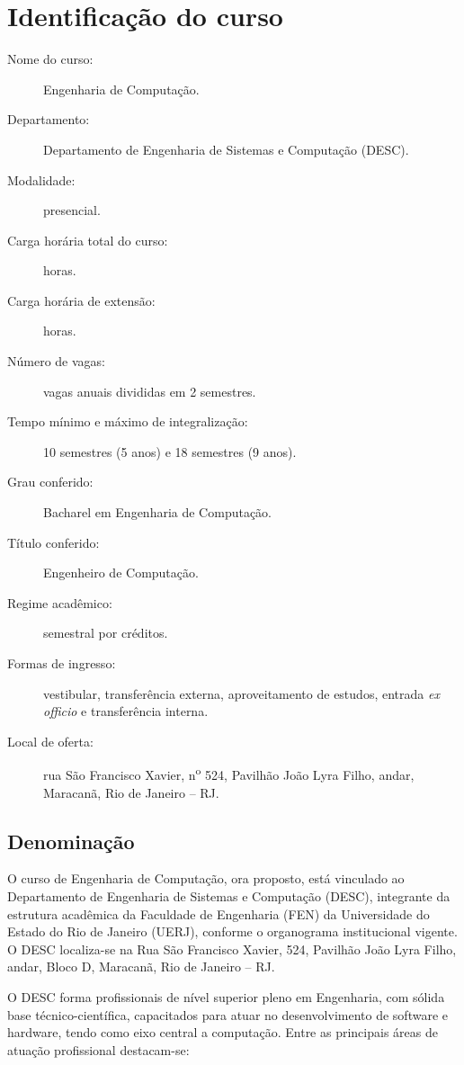 \chapter{Identificação do curso}
\thispagestyle{plain}

\begin{description}
    \item [Nome do curso:] Engenharia de Computação.
    \item [Departamento:] Departamento de Engenharia de Sistemas e Computação (DESC).
    \item [Modalidade:] presencial.
    \item [Carga horária total do curso:] \tHorasCurso horas.
    \item [Carga horária de extensão:] \hExtensao horas.
    \item [Número de vagas:] \vagas vagas anuais divididas em 2 semestres.
    \item [Tempo mínimo e máximo de integralização:] 10 semestres (5 anos) e 18 semestres (9 anos).
    \item [Grau conferido:] Bacharel em Engenharia de Computação.
    \item [Título conferido:] Engenheiro de Computação.
    \item [Regime acadêmico:] semestral por créditos.
    \item [Formas de ingresso:] vestibular, transferência externa, aproveitamento de estudos, entrada \textit{ex officio} e transferência interna.
    \item [Local de oferta:] rua São Francisco Xavier, n\textsuperscript{o} 524, Pavilhão João Lyra Filho,  andar, Maracanã, Rio de Janeiro – RJ.
\end{description}
\section{Denominação}

O curso de Engenharia de Computação, ora proposto, está vinculado ao Departamento de Engenharia de Sistemas e Computação (DESC), integrante da estrutura acadêmica da Faculdade de Engenharia (FEN) da Universidade do Estado do Rio de Janeiro (UERJ), conforme o organograma institucional vigente. O DESC localiza-se na Rua São Francisco Xavier,  524, Pavilhão João Lyra Filho,  andar, Bloco D, Maracanã, Rio de Janeiro – RJ.

O DESC forma profissionais de nível superior pleno em Engenharia, com sólida base técnico-científica, capacitados para atuar no desenvolvimento de software e hardware, tendo como eixo central a computação. Entre as principais áreas de atuação profissional destacam-se:

